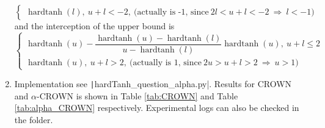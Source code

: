 \documentclass[12pt]{article}
\newcommand{\hardtanh}[1]{\operatorname{hardtanh}\left(#1\right)}
\begin{document}
\begin{enumerate}[1.]
\begin{equation}
\begin{cases}
		\hardtanh{l}, \ u + l < -2, \ \text{(actually is -1, since} \ 2 l < u + l < -2 \ \Rightarrow \ l < -1 \text{)}
	\end{cases}
	\end{equation}
	and the interception of the upper bound is
	\begin{equation}
	\begin{cases}
		\hardtanh{u} - \dfrac{\hardtanh{u} - \hardtanh{l}}{u - \hardtanh{l}} \hardtanh{u}, \ u + l \leqslant 2\\
		\hardtanh{u}, \ u + l > 2, \ \text{(actually is 1, since} \ 2 u > u + l > 2 \ \Rightarrow \ u > 1 \text{)}
	\end{cases}
	\end{equation}

\item Implementation see \texttt|hardTanh_question_alpha.py|. Results for CROWN and $\alpha$-CROWN is shown in Table \ref{tab:CROWN} and Table \ref{tab:alpha_CROWN} respectively. Experimental logs can also be checked in the folder.


\end{enumerate}
\end{document}
